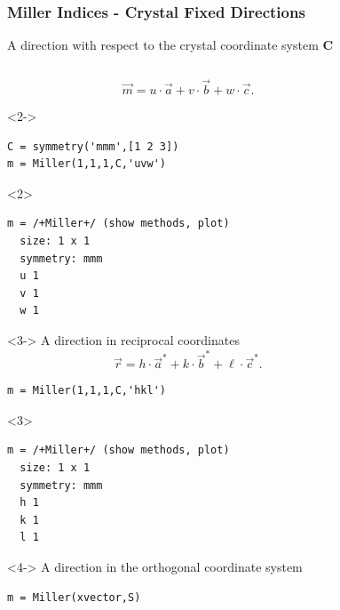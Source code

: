 \documentclass[compress]{beamer}
\begin{document}
\begin{frame}[fragile]
  \frametitle{Miller Indices - Crystal Fixed Directions}

  A direction with respect to the crystal coordinate system  $\mathbf C$

  \begin{columns}
    \begin{column}{7cm}

      \begin{overlayarea}{8cm}{8cm}

        \begin{equation*}
          \vec m = u \cdot \vec a+ v \cdot \vec b + w \cdot \vec c.
        \end{equation*}

    \begin{onlyenv}<2->
\begin{lstlisting}[style=input]
C = symmetry('mmm',[1 2 3])
m = Miller(1,1,1,C,'uvw')
\end{lstlisting}
\end{onlyenv}
\begin{onlyenv}<2>
\vspace{-.3cm}\begin{lstlisting}[style=output]
m = /+Miller+/ (show methods, plot)
  size: 1 x 1
  symmetry: mmm
  u 1
  v 1
  w 1
\end{lstlisting}
\end{onlyenv}

    \begin{onlyenv}<3->
A direction in reciprocal coordinates
\begin{equation*}
  \vec r = h \cdot \vec a^{*}+ k \cdot \vec b^{*} + \ell \cdot \vec c^{*}.
\end{equation*}
\begin{lstlisting}[style=input]
m = Miller(1,1,1,C,'hkl')
\end{lstlisting}
\end{onlyenv}
\begin{onlyenv}<3>
\vspace{-.3cm}\begin{lstlisting}[style=output]
m = /+Miller+/ (show methods, plot)
  size: 1 x 1
  symmetry: mmm
  h 1
  k 1
  l 1
\end{lstlisting}
\end{onlyenv}

\medskip

\begin{onlyenv}<4->
  A direction in the orthogonal coordinate system
  \begin{lstlisting}[style=input]
m = Miller(xvector,S)
\end{lstlisting}
\end{onlyenv}
\end{overlayarea}
\end{column}
    \begin{column}{4cm}


\end{column}
\end{columns}
\end{frame}
\end{document}
